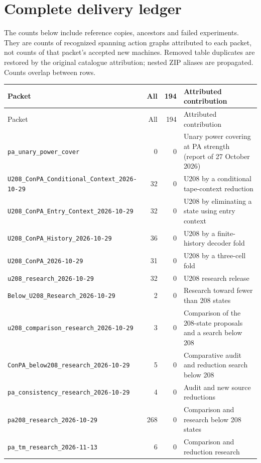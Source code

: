 \section{Complete delivery ledger}
The counts below include reference copies, ancestors and failed experiments.
They are counts of recognized spanning action graphs attributed to each packet,
not counts of that packet's accepted new machines. Removed table duplicates are
restored by the original catalogue attribution; nested ZIP aliases are propagated.
Counts overlap between rows.
\begingroup\fontsize{9}{10.5}\selectfont
\setlength{\tabcolsep}{3pt}
\begin{longtable}{@{}p{.39\linewidth}rrp{.43\linewidth}@{}}
\toprule
Packet & All & 194 & Attributed contribution \\
\midrule\endfirsthead
\toprule Packet & All & 194 & Attributed contribution \\
\midrule\endhead
\bottomrule\endfoot
\nolinkurl{pa_unary_power_cover} & 0 & 0 & Unary power covering at PA strength (report of 27 October 2026) \\
\nolinkurl{U208_ConPA_Conditional_Context_2026-10-29} & 32 & 0 & U208 by a conditional tape-context reduction \\
\nolinkurl{U208_ConPA_Entry_Context_2026-10-29} & 32 & 0 & U208 by eliminating a state using entry context \\
\nolinkurl{U208_ConPA_History_2026-10-29} & 36 & 0 & U208 by a finite-history decoder fold \\
\nolinkurl{U208_ConPA_2026-10-29} & 31 & 0 & U208 by a three-cell fold \\
\nolinkurl{u208_research_2026-10-29} & 32 & 0 & U208 research release \\
\nolinkurl{Below_U208_Research_2026-10-29} & 2 & 0 & Research toward fewer than 208 states \\
\nolinkurl{u208_comparison_research_2026-10-29} & 3 & 0 & Comparison of the 208-state proposals and a search below 208 \\
\nolinkurl{ConPA_below208_research_2026-10-29} & 5 & 0 & Comparative audit and reduction search below 208 \\
\nolinkurl{pa_consistency_research_2026-10-29} & 4 & 0 & Audit and new source reductions \\
\nolinkurl{pa208_research_2026-10-29} & 268 & 0 & Comparison and research below 208 states \\
\nolinkurl{pa_tm_research_2026-11-13} & 6 & 0 & Comparison and reduction research \\

\end{longtable}
